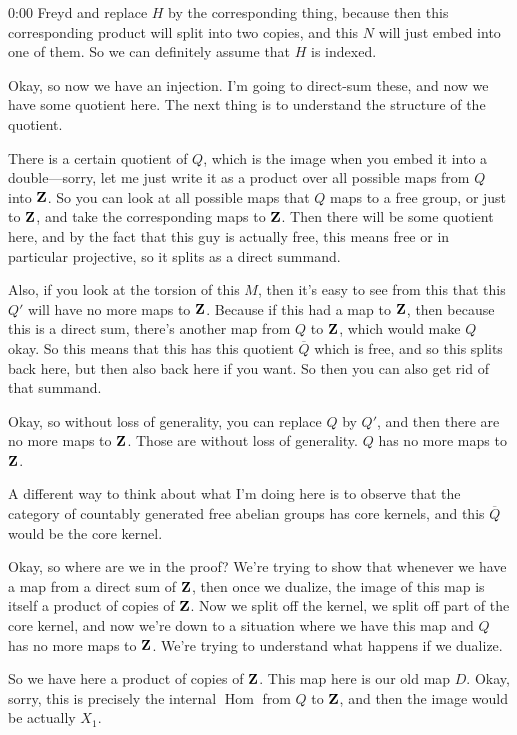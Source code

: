 \begin{unfinished}{0:00}
Freyd and replace $H$ by the corresponding thing, because then this corresponding product will split into two copies, and this $N$ will just embed into one of them. So we can definitely assume that $H$ is indexed.

Okay, so now we have an injection. I'm going to direct-sum these, and now we have some quotient here. The next thing is to understand the structure of the quotient.

There is a certain quotient of $Q$, which is the image when you embed it into a double---sorry, let me just write it as a product over all possible maps from $Q$ into $\mathbf Z$. So you can look at all possible maps that $Q$ maps to a free group, or just to $\mathbf Z$, and take the corresponding maps to $\mathbf Z$. Then there will be some quotient here, and by the fact that this guy is actually free, this means free or in particular projective, so it splits as a direct summand.

Also, if you look at the torsion of this $M$, then it's easy to see from this that this $Q'$ will have no more maps to $\mathbf Z$. Because if this had a map to $\mathbf Z$, then because this is a direct sum, there's another map from $Q$ to $\mathbf Z$, which would make $Q$ okay. So this means that this has this quotient $\overline{Q}$ which is free, and so this splits back here, but then also back here if you want. So then you can also get rid of that summand.

Okay, so without loss of generality, you can replace $Q$ by $Q'$, and then there are no more maps to $\mathbf Z$. Those are without loss of generality. $Q$ has no more maps to $\mathbf Z$.

A different way to think about what I'm doing here is to observe that the category of countably generated free abelian groups has core kernels, and this $\overline{Q}$ would be the core kernel.

Okay, so where are we in the proof? We're trying to show that whenever we have a map from a direct sum of $\mathbf Z$, then once we dualize, the image of this map is itself a product of copies of $\mathbf Z$. Now we split off the kernel, we split off part of the core kernel, and now we're down to a situation where we have this map and $Q$ has no more maps to $\mathbf Z$. We're trying to understand what happens if we dualize.

So we have here a product of copies of $\mathbf Z$. This map here is our old map $D$. Okay, sorry, this is precisely the internal $\operatorname{Hom}$ from $Q$ to $\mathbf Z$, and then the image would be actually $X_1$.


\end{unfinished}
